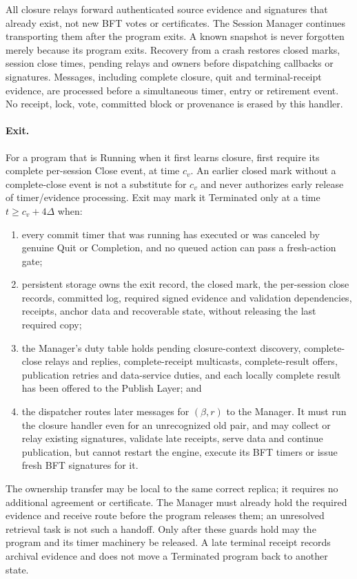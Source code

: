 \documentclass[11pt,a4paper]{article}
\begin{document}
All closure relays forward authenticated source evidence and
signatures that already exist, not new BFT votes or certificates. The Session Manager
continues transporting them after the program exits. A known snapshot
is never forgotten merely because its program exits. Recovery from a
crash restores closed marks, session close times, pending relays and owners
before dispatching callbacks or signatures. Messages, including complete
closure, quit and terminal-receipt evidence, are processed before a
simultaneous timer, entry or retirement event. No receipt, lock, vote,
committed block or provenance is erased by this handler.


\paragraph{Exit.}
For a program that is Running when it first learns closure, first
require its complete per-session Close event, at time $c_v$.
An earlier closed mark without a complete-close event is not a substitute
for $c_v$ and never authorizes early release of timer/evidence processing.
Exit may mark it Terminated only at a time $t\ge c_v+4\Delta$ when:
\begin{enumerate}[label=(\roman*),itemsep=2pt]
\item every commit timer that was running has executed or was canceled by
genuine Quit or Completion, and no queued action can pass a fresh-action
gate;
\item persistent storage owns the exit record, the closed mark, the per-session close records,
committed log, required signed evidence and validation dependencies,
receipts, anchor data and recoverable state, without releasing the last
required copy;
\item the Manager's duty table holds pending closure-context discovery,
complete-close relays and replies, complete-receipt multicasts,
complete-result offers, publication retries and data-service duties, and each locally complete result has been offered to the
Publish Layer; and
\item the dispatcher routes later messages for $(\beta,r)$ to the
Manager. It must run the closure handler even for an
unrecognized old pair, and may collect or relay existing signatures,
validate late receipts, serve data and continue publication, but cannot restart the
engine, execute its BFT timers or issue fresh BFT signatures for it.
\end{enumerate}
The ownership transfer may be local to the same correct replica; it
requires no additional agreement or certificate. The Manager must already hold the required evidence and receive route before
the program releases them; an unresolved retrieval task is not such
a handoff. Only after these
guards hold may the program and its timer machinery
be released. A late terminal receipt records archival evidence and does
not move a Terminated program back to another state.
\end{document}
